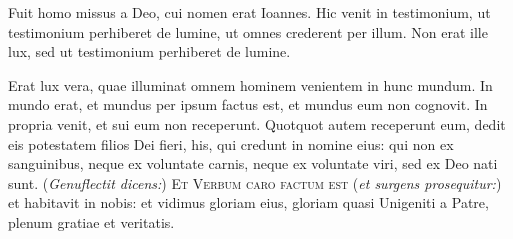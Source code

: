 Fuit homo missus a Deo, cui nomen erat Ioannes.  Hic venit in testimonium, ut
testimonium perhiberet de lumine, ut omnes crederent per illum.  Non erat ille
lux, sed ut testimonium perhiberet de lumine.

Erat lux vera, quae illuminat omnem hominem venientem in hunc mundum.  In mundo
erat, et mundus per ipsum factus est, et mundus eum non cognovit.  In propria
venit, et sui eum non receperunt.  Quotquot autem receperunt eum, dedit eis
potestatem filios Dei fieri, his, qui credunt in nomine eius: qui non ex
sanguinibus, neque ex voluntate carnis, neque ex voluntate viri, sed ex Deo nati
sunt.  (\textit{Genuflectit dicens:}) \textsc{Et Verbum caro factum est}
(\textit{et surgens prosequitur:}) et habitavit in nobis: et vidimus gloriam
eius, gloriam quasi Unigeniti a Patre, plenum gratiae et veritatis.

